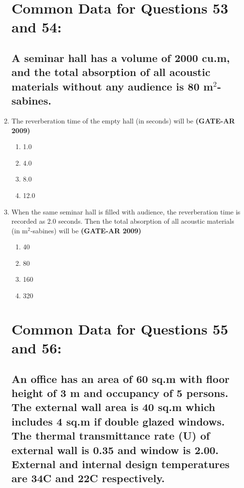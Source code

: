 \documentclass[a4paper,10pt]{article}
\begin{document}
\begin{enumerate}
\section*{Common Data for Questions 53 and 54:}
\subsection*{A seminar hall has a volume of 2000 cu.m, and the total absorption of all acoustic materials without any audience is 80 m\(^2\)-sabines.}

    \item The reverberation time of the empty hall (in seconds) will be \hfill \textbf{(GATE-AR 2009)}
    \begin{multicols}{4}
	\begin{enumerate}
        \item 1.0
        \item 4.0
        \item 8.0
        \item 12.0
    \end{enumerate}
	\end{multicols}

    \item When the same seminar hall is filled with audience, the reverberation time is recorded as 2.0 seconds. Then the total absorption of all acoustic materials (in m\(^2\)-sabines) will be \hfill \textbf{(GATE-AR 2009)}
    \begin{multicols}{4}
	\begin{enumerate}
        \item 40
        \item 80
        \item 160
        \item 320
    \end{enumerate}
	\end{multicols}
	
\section*{Common Data for Questions 55 and 56:}
\subsection*{An office has an area of 60 sq.m with floor height of 3 m and occupancy of 5 persons. The external wall area is 40 sq.m which includes 4 sq.m if double glazed windows. The thermal transmittance rate (U) of external wall is 0.35 and window is 2.00. External and internal design temperatures are 34\textdegree C and 22\textdegree C respectively.}


\end{enumerate}
\end{document}
